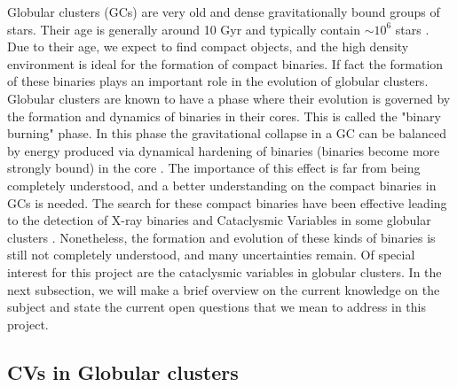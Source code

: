 Globular clusters (GCs) are very old and dense gravitationally bound groups of stars. Their age is generally around 10 Gyr \citep{meylan_internal_1997} and typically contain $\sim 10^6$ stars \citep{knigge_cataclysmic_2012}. Due to their age, we expect to find compact objects, and the high density environment is ideal for the formation of compact binaries. If fact the formation of these binaries plays an important role in the evolution of globular clusters. Globular clusters are known to have a phase where their evolution is governed by the formation and dynamics of binaries in their cores. This is called the "binary burning" phase. In this phase the gravitational collapse in a GC can be balanced by energy produced via dynamical hardening of binaries (binaries become more strongly bound) in the core \citep[e.g.][]{hut_binaries_1992}. The importance of this effect is far from being completely understood, and a better understanding on the compact binaries in GCs is needed. The search for these compact binaries have been effective leading to the detection of X-ray binaries and Cataclysmic Variables in some globular clusters \citep[e.g.][]{maccarone_compact_2007}. Nonetheless, the formation and evolution of these kinds of binaries is still not completely understood, and many uncertainties remain. Of special interest for this project are the cataclysmic variables in globular clusters. In the next subsection, we will make a brief overview on the current knowledge on the subject and state the current open questions that we mean to address in this project. 


%

\subsection{CVs in Globular clusters}\label{sec:cogc}

